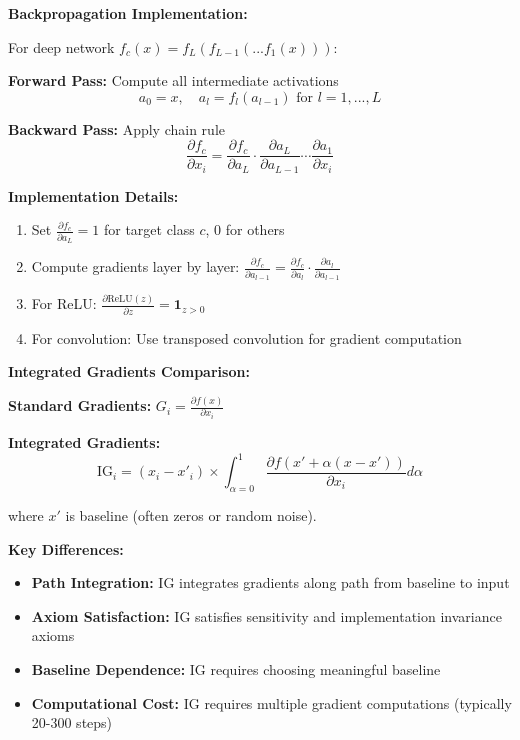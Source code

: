 \documentclass[12pt]{article}
\begin{document}
\begin{enumerate}[(a)]
{    \textbf{Backpropagation Implementation:}
    
    For deep network $f_c(x) = f_L(f_{L-1}(...f_1(x)))$:
    
    \textbf{Forward Pass:} Compute all intermediate activations
    $$a_0 = x, \quad a_l = f_l(a_{l-1}) \text{ for } l = 1,...,L$$
    
    \textbf{Backward Pass:} Apply chain rule
    $$\frac{\partial f_c}{\partial x_i} = \frac{\partial f_c}{\partial a_L} \cdot \frac{\partial a_L}{\partial a_{L-1}} \cdots \frac{\partial a_1}{\partial x_i}$$
    
    \textbf{Implementation Details:}
    \begin{enumerate}
        \item Set $\frac{\partial f_c}{\partial a_L} = 1$ for target class $c$, $0$ for others
        \item Compute gradients layer by layer: $\frac{\partial f_c}{\partial a_{l-1}} = \frac{\partial f_c}{\partial a_l} \cdot \frac{\partial a_l}{\partial a_{l-1}}$
        \item For ReLU: $\frac{\partial \text{ReLU}(z)}{\partial z} = \mathbf{1}_{z > 0}$
        \item For convolution: Use transposed convolution for gradient computation
    \end{enumerate}
    
    \textbf{Integrated Gradients Comparison:}
    
    \textbf{Standard Gradients:} $G_i = \frac{\partial f(x)}{\partial x_i}$
    
    \textbf{Integrated Gradients:} 
    $$\text{IG}_i = (x_i - x'_i) \times \int_{\alpha=0}^1 \frac{\partial f(x' + \alpha(x-x'))}{\partial x_i} d\alpha$$
    
    where $x'$ is baseline (often zeros or random noise).
    
    \textbf{Key Differences:}
    \begin{itemize}
        \item \textbf{Path Integration:} IG integrates gradients along path from baseline to input
        \item \textbf{Axiom Satisfaction:} IG satisfies sensitivity and implementation invariance axioms
        \item \textbf{Baseline Dependence:} IG requires choosing meaningful baseline
        \item \textbf{Computational Cost:} IG requires multiple gradient computations (typically 20-300 steps)
    \end{itemize}
    
}
\end{enumerate}
\end{document}

